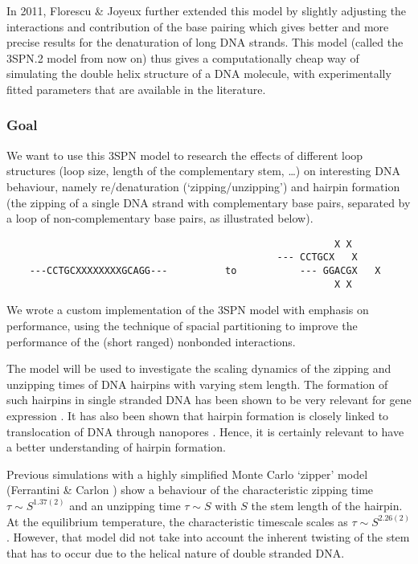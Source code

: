 In 2011, Florescu \& Joyeux \cite{florescu2011thermal} further extended this model by slightly adjusting the interactions and contribution of the base pairing which gives better and more precise results for the denaturation of long DNA strands. This model (called the 3SPN.2 model from now on) thus gives a computationally cheap way of simulating the double helix structure of a DNA molecule, with experimentally fitted parameters that are available in the literature.



\subsubsection*{Goal}

We want to use this 3SPN model to research the effects of different loop structures (loop size, length of the complementary stem, \ldots) on interesting DNA behaviour, namely re/denaturation (`zipping/unzipping') and hairpin formation (the zipping of a single DNA strand with complementary base pairs, separated by a loop of non-complementary base pairs, as illustrated below).
\begin{verbatim}
                                                         X X
                                               --- CCTGCX   X
    ---CCTGCXXXXXXXXGCAGG---	      to           --- GGACGX   X
                                                         X X
\end{verbatim}We wrote a custom implementation of the 3SPN model with emphasis on performance, using the technique of spacial partitioning \cite{plimpton1995fast} to improve the performance of the (short ranged) nonbonded interactions.

The model will be used to investigate the scaling dynamics of the zipping and unzipping times of DNA hairpins with varying stem length. The formation of such hairpins in single stranded DNA has been shown to be very relevant for gene expression \cite{oettinger2000hairpins}. It has also been shown that hairpin formation is closely linked to translocation of DNA through nanopores \cite{carlon2011anomalous}. Hence, it is certainly relevant to have a better understanding of hairpin formation.

Previous simulations with a highly simplified Monte Carlo `zipper' model (Ferrantini \& Carlon \cite{carlon2011anomalous}) show a behaviour of the characteristic zipping time $\tau \sim S^{1.37(2)}$ and an unzipping time $\tau \sim S$ with $S$ the stem length of the hairpin. At the equilibrium temperature, the characteristic timescale scales as $\tau \sim S^{2.26(2)}$ \cite{walter2011fractional}. However, that model did not take into account the inherent twisting of the stem that has to occur due to the helical nature of double stranded DNA.

